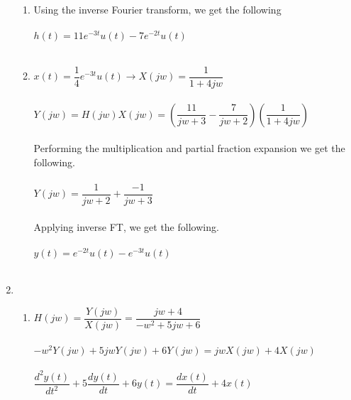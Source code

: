 \documentclass[10pt,a4paper, margin=1in]{article}
\begin{document}
\begin{enumerate}
\begin{enumerate}
    \item %
    Using the inverse Fourier transform, we get the following\\\\
    $h(t) = 11e^{-3t}u(t)-7e^{-2t}u(t)$\\\\
    \item %
    $x(t)=\dfrac{1}{4}e^{-3t}u(t) \longrightarrow X(jw)=  \dfrac{1}{1+4jw}$\\\\
    $Y(jw)=H(jw)X(jw)=(\dfrac{11}{jw+3} -\dfrac{7}{jw+2})(\dfrac{1}{1+4jw})$\\\\
    Performing the multiplication and partial fraction expansion we get the following.\\\\
    $Y(jw)=\dfrac{1}{jw+2} + \dfrac{-1}{jw+3}$\\\\
    Applying inverse FT, we get the following.\\\\
    $y(t)=e^{-2t}u(t) - e^{-3t}u(t)$\\\\
    \end{enumerate}

\item %
    \begin{enumerate}
    \item %
    $H(jw)=\dfrac{Y(jw)}{X(jw)}=\dfrac{jw+4}{-w^{2}+5jw+6}$\\\\
    $-w^{2}Y(jw) +5jwY(jw)+6Y(jw)=jwX(jw)+4X(jw)$\\\\
    $\dfrac{d^{2}y(t)}{dt^{2}} +5\dfrac{dy(t)}{dt} + 6y(t)=\dfrac{dx(t)}{dt}+4x(t)$\\\\


\end{enumerate}
\end{enumerate}
\end{document}
